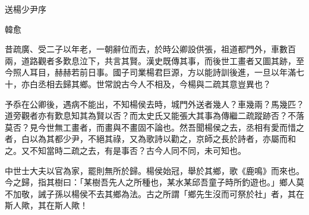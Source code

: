 送楊少尹序

韓愈

昔疏廣、受二子以年老，一朝辭位而去，於時公卿設供張，祖道都門外，車數百兩，道路觀者多歎息泣下，共言其賢。漢史既傳其事，而後世工畫者又圖其跡，至今照人耳目，赫赫若前日事。國子司業楊君巨源，方以能詩訓後進，一旦以年滿七十，亦白丞相去歸其鄉。世常說古今人不相及，今楊與二疏其意豈異也？

予忝在公卿後，遇病不能出，不知楊侯去時，城門外送者幾人？車幾兩？馬幾匹？道旁觀者亦有歎息知其為賢以否？而太史氏又能張大其事為傳繼二疏蹤跡否？不落莫否？見今世無工畫者，而畫與不畫固不論也。然吾聞楊侯之去，丞相有愛而惜之者，白以為其都少尹，不絕其祿，又為歌詩以勸之，京師之長於詩者，亦屬而和之。又不知當時二疏之去，有是事否？古今人同不同，未可知也。

中世士大夫以官為家，罷則無所於歸。楊侯始冠，舉於其鄉，歌《鹿鳴》而來也。今之歸，指其樹曰：「某樹吾先人之所種也，某水某邱吾童子時所釣遊也。」鄉人莫不加敬，誡子孫以楊侯不去其鄉為法。古之所謂「鄉先生沒而可祭於社」者，其在斯人歟，其在斯人歟！